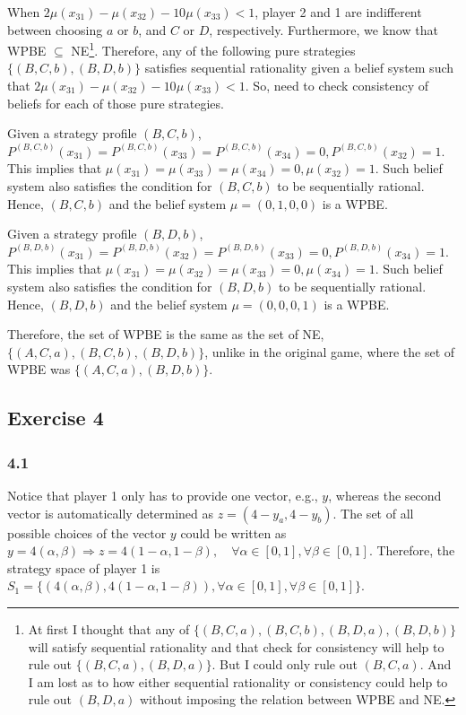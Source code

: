 \documentclass[]{article}
\begin{document}
\begin{enumerate}[label=(\roman*)]
	When $2\mu(x_{31}) - \mu(x_{32}) - 10\mu(x_{33}) < 1$, player 2 and 1 are indifferent between choosing $a$ or $b$, and $C$ or $D$, respectively. Furthermore, we know that WPBE $\subseteq$ NE\footnote{At first I thought that any of $\{(B, C, a), (B, C, b), (B, D, a), (B, D, b)\}$ will satisfy sequential rationality and that check for consistency will help to rule out $\{(B, C, a), (B, D, a)\}$. But I could only rule out $(B, C, a)$. And I am lost as to how either sequential rationality or consistency could help to rule out $(B, D, a)$ without imposing the relation between WPBE and NE.}. Therefore, any of the following pure strategies $\{(B, C, b), (B, D, b)\}$ satisfies sequential rationality given a belief system such that  $2\mu(x_{31}) - \mu(x_{32}) - 10\mu(x_{33}) < 1$. So, need to check consistency of beliefs for each of those pure strategies.
	
	Given a strategy profile $(B, C, b)$, $P^{(B, C, b)}(x_{31}) = P^{(B, C, b)}(x_{33}) = P^{(B, C, b)}(x_{34}) = 0, P^{(B, C, b)}(x_{32}) = 1$. This implies that $\mu(x_{31}) = \mu(x_{33}) = \mu(x_{34}) = 0, \mu(x_{32}) = 1$. Such belief system also satisfies the condition for $(B, C, b)$ to be sequentially rational. Hence, $(B, C, b)$ and the belief system $\mu = (0, 1, 0, 0)$ is a WPBE.
	
	Given a strategy profile $(B, D, b)$, $P^{(B, D, b)}(x_{31}) = P^{(B, D, b)}(x_{32}) = P^{(B, D, b)}(x_{33}) = 0, P^{(B, D, b)}(x_{34}) = 1$. This implies that $\mu(x_{31}) = \mu(x_{32}) = \mu(x_{33}) = 0, \mu(x_{34}) = 1$. Such belief system also satisfies the condition for $(B, D, b)$ to be sequentially rational. Hence, $(B, D, b)$ and the belief system $\mu = (0, 0, 0, 1)$ is a WPBE.
	
	Therefore, the set of WPBE is the same as the set of NE, $\{(A, C, a), (B, C, b), (B, D, b)\}$, unlike in the original game, where the set of WPBE was $\{(A, C, a), (B, D, b)\}$.
\end{enumerate}

\subsection*{Exercise 4}

\subsubsection*{4.1}
Notice that player 1 only has to provide one vector, e.g., $y$, whereas the second vector is automatically determined as $z = (4 - y_a, 4 - y_b)$. The set of all possible choices of the vector $y$ could be written as $y = 4(\alpha, \beta) \Longrightarrow z = 4(1 - \alpha, 1 - \beta), \quad\forall\alpha\in[0, 1], \forall\beta\in[0, 1]$. Therefore, the strategy space of player 1 is $S_1 = \{(4(\alpha, \beta), 4 (1 - \alpha, 1 - \beta)), \forall\alpha\in[0, 1], \forall\beta\in[0, 1]\}$.
\end{document}
